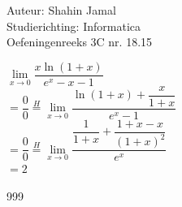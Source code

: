 \documentclass[a4paper]{article}
\begin{document}
  
\noindent \large Auteur: Shahin Jamal \\
\noindent \large Studierichting: Informatica\\
\noindent \large Oefeningenreeks 3C nr. 18.15\\

\medskip

\normalsize

$\lim\limits_{x \rightarrow 0}\dfrac{x\ln(1+x)}{e^x - x - 1}$\\

$= \dfrac{0}{0} \overset{H}{=} \lim\limits_{x \rightarrow 0}\dfrac{\ln(1+x) + \dfrac{x}{1+x}}{e^x-1}$\\

$= \dfrac{0}{0} \overset{H}{=} \lim\limits_{x \rightarrow 0}\dfrac{\dfrac{1}{1+x} + \dfrac{1+x-x}{(1+x)^2}}{e^x}$\\

$= 2$\\

\begin{thebibliography}{999}
\end{thebibliography}
\end{document}
